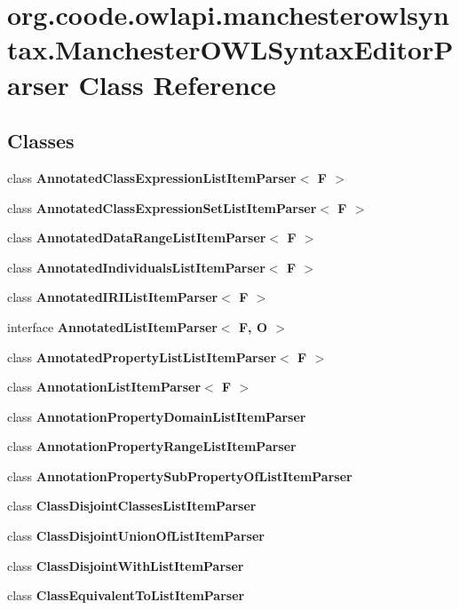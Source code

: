 \hypertarget{classorg_1_1coode_1_1owlapi_1_1manchesterowlsyntax_1_1_manchester_o_w_l_syntax_editor_parser}{\section{org.\-coode.\-owlapi.\-manchesterowlsyntax.\-Manchester\-O\-W\-L\-Syntax\-Editor\-Parser Class Reference}
\label{classorg_1_1coode_1_1owlapi_1_1manchesterowlsyntax_1_1_manchester_o_w_l_syntax_editor_parser}
}
\subsection*{Classes}
\begin{DoxyCompactItemize}
\item 
class {\bfseries Annotated\-Class\-Expression\-List\-Item\-Parser$<$ F $>$}
\item 
class {\bfseries Annotated\-Class\-Expression\-Set\-List\-Item\-Parser$<$ F $>$}
\item 
class {\bfseries Annotated\-Data\-Range\-List\-Item\-Parser$<$ F $>$}
\item 
class {\bfseries Annotated\-Individuals\-List\-Item\-Parser$<$ F $>$}
\item 
class {\bfseries Annotated\-I\-R\-I\-List\-Item\-Parser$<$ F $>$}
\item 
interface {\bfseries Annotated\-List\-Item\-Parser$<$ F, O $>$}
\item 
class {\bfseries Annotated\-Property\-List\-List\-Item\-Parser$<$ F $>$}
\item 
class {\bfseries Annotation\-List\-Item\-Parser$<$ F $>$}
\item 
class {\bfseries Annotation\-Property\-Domain\-List\-Item\-Parser}
\item 
class {\bfseries Annotation\-Property\-Range\-List\-Item\-Parser}
\item 
class {\bfseries Annotation\-Property\-Sub\-Property\-Of\-List\-Item\-Parser}
\item 
class {\bfseries Class\-Disjoint\-Classes\-List\-Item\-Parser}
\item 
class {\bfseries Class\-Disjoint\-Union\-Of\-List\-Item\-Parser}
\item 
class {\bfseries Class\-Disjoint\-With\-List\-Item\-Parser}
\item 
class {\bfseries Class\-Equivalent\-To\-List\-Item\-Parser}

\end{DoxyCompactItemize}
